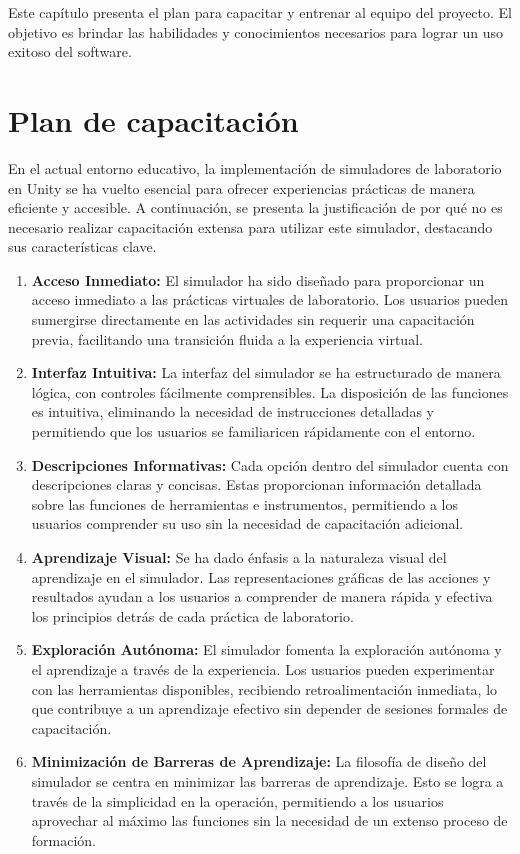 Este capítulo presenta el plan para capacitar y entrenar al equipo del proyecto. El objetivo es brindar las habilidades y conocimientos necesarios para lograr un uso exitoso del software.
\section{Plan de capacitación}

En el actual entorno educativo, la implementación de simuladores de laboratorio en Unity se ha vuelto esencial para ofrecer experiencias prácticas de manera eficiente y accesible. A continuación, se presenta la justificación de por qué no es necesario realizar capacitación extensa para utilizar este simulador, destacando sus características clave.

\begin{enumerate}
    \item \textbf{Acceso Inmediato:} El simulador ha sido diseñado para proporcionar un acceso inmediato a las prácticas virtuales de laboratorio. Los usuarios pueden sumergirse directamente en las actividades sin requerir una capacitación previa, facilitando una transición fluida a la experiencia virtual.

    \item \textbf{Interfaz Intuitiva:} La interfaz del simulador se ha estructurado de manera lógica, con controles fácilmente comprensibles. La disposición de las funciones es intuitiva, eliminando la necesidad de instrucciones detalladas y permitiendo que los usuarios se familiaricen rápidamente con el entorno.

    \item \textbf{Descripciones Informativas:} Cada opción dentro del simulador cuenta con descripciones claras y concisas. Estas proporcionan información detallada sobre las funciones de herramientas e instrumentos, permitiendo a los usuarios comprender su uso sin la necesidad de capacitación adicional.

    \item \textbf{Aprendizaje Visual:} Se ha dado énfasis a la naturaleza visual del aprendizaje en el simulador. Las representaciones gráficas de las acciones y resultados ayudan a los usuarios a comprender de manera rápida y efectiva los principios detrás de cada práctica de laboratorio.

    \item \textbf{Exploración Autónoma:} El simulador fomenta la exploración autónoma y el aprendizaje a través de la experiencia. Los usuarios pueden experimentar con las herramientas disponibles, recibiendo retroalimentación inmediata, lo que contribuye a un aprendizaje efectivo sin depender de sesiones formales de capacitación.

    \item \textbf{Minimización de Barreras de Aprendizaje:} La filosofía de diseño del simulador se centra en minimizar las barreras de aprendizaje. Esto se logra a través de la simplicidad en la operación, permitiendo a los usuarios aprovechar al máximo las funciones sin la necesidad de un extenso proceso de formación.
\end{enumerate}

